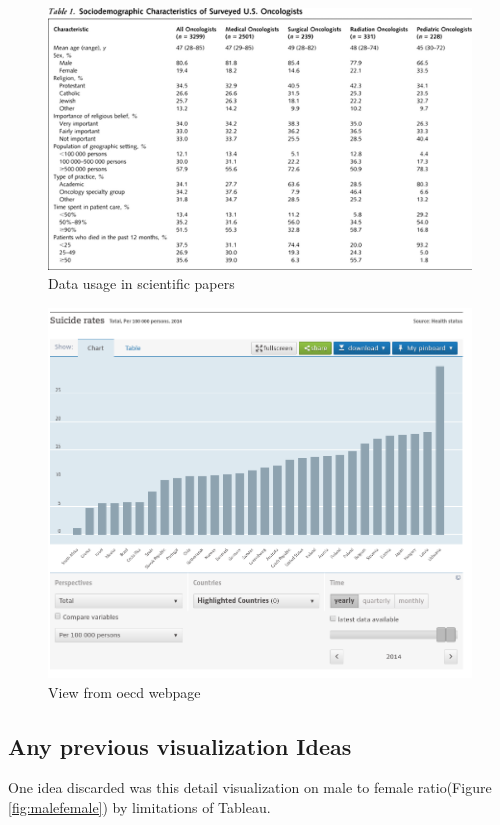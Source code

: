 \documentclass{vgtc}                          %
\begin{document}
\begin{figure}[tb]
\centering
\includegraphics[width=\columnwidth]{image/roman/scientificvalues.png}
\caption{Data usage in scientific papers}
\label{fig:scientific} 
\end{figure}

\begin{figure}[tb]
\centering
\includegraphics[width=\columnwidth]{image/roman/oecd.png}
\caption{View from oecd webpage}
\label{fig:oecd} 
\end{figure}

\subsection{Any previous visualization Ideas}
One idea discarded was this detail visualization on male to female ratio(Figure \ref{fig:malefemale}) by limitations of Tableau.
\end{document}
